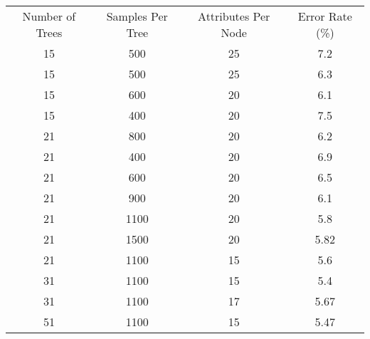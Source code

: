 \documentclass[11pt]{article}
\begin{document}
\begin{tabular}{|c|c|c||c|}
\hline
Number of Trees & Samples Per Tree & Attributes Per Node & Error Rate (\%)\\
15 & 500 & 25 & 7.2 \\
15 & 500 & 25 & 6.3 \\
15 & 600 & 20 & 6.1 \\
15 & 400 & 20 & 7.5 \\
21 & 800 & 20 & 6.2 \\
21 & 400 & 20 & 6.9 \\
21 & 600 & 20 & 6.5 \\
21 & 900 & 20 & 6.1 \\
21 & 1100 & 20 & 5.8 \\
21 & 1500 & 20 & 5.82 \\
21 & 1100 & 15 & 5.6 \\
31 & 1100 & 15 & 5.4 \\
31 & 1100 & 17 & 5.67 \\
51 & 1100 & 15 & 5.47 \\
\hline

\end{tabular}
\end{document}
